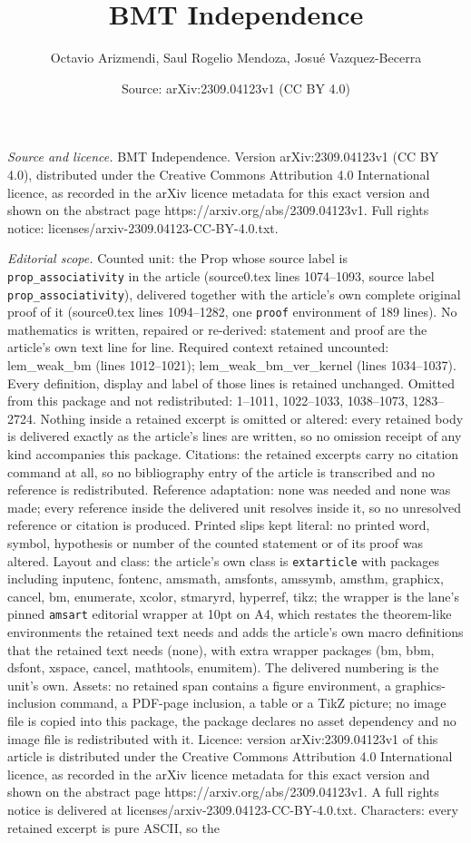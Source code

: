 \documentclass[10pt,a4paper]{amsart}
\title[BMT Independence]{BMT Independence}
\author{Octavio Arizmendi, Saul Rogelio Mendoza, Josu\'e Vazquez-Becerra}
\date{Source: arXiv:2309.04123v1 (CC BY 4.0)}
\begin{document}
\maketitle

\noindent\emph{Source and licence.} BMT Independence. Version arXiv:2309.04123v1 (CC BY 4.0), distributed under the Creative Commons Attribution 4.0 International licence, as recorded in the arXiv licence metadata for this exact version and shown on the abstract page https://arxiv.org/abs/2309.04123v1. Full rights notice: licenses/arxiv-2309.04123-CC-BY-4.0.txt.\par\smallskip

\noindent\textit{Editorial scope.} Counted unit: the Prop whose source label is \texttt{prop\_associativity} in the article (source0.tex lines 1074--1093, source label \texttt{prop\_associativity}), delivered together with the article's own complete original proof of it (source0.tex lines 1094--1282, one \texttt{proof} environment of 189 lines). No mathematics is written, repaired or re-derived: statement and proof are the article's own text line for line. Required context retained uncounted: lem\_weak\_bm (lines 1012--1021); lem\_weak\_bm\_ver\_kernel (lines 1034--1037). Every definition, display and label of those lines is retained unchanged. Omitted from this package and not redistributed: 1--1011, 1022--1033, 1038--1073, 1283--2724. Nothing inside a retained excerpt is omitted or altered: every retained body is delivered exactly as the article's lines are written, so no omission receipt of any kind accompanies this package. Citations: the retained excerpts carry no citation command at all, so no bibliography entry of the article is transcribed and no reference is redistributed. Reference adaptation: none was needed and none was made; every reference inside the delivered unit resolves inside it, so no unresolved reference or citation is produced. Printed slips kept literal: no printed word, symbol, hypothesis or number of the counted statement or of its proof was altered. Layout and class: the article's own class is \texttt{extarticle} with packages including inputenc, fontenc, amsmath, amsfonts, amssymb, amsthm, graphicx, cancel, bm, enumerate, xcolor, stmaryrd, hyperref, tikz; the wrapper is the lane's pinned \texttt{amsart} editorial wrapper at 10pt on A4, which restates the theorem-like environments the retained text needs and adds the article's own macro definitions that the retained text needs (none), with extra wrapper packages (bm, bbm, dsfont, xspace, cancel, mathtools, enumitem). The delivered numbering is the unit's own. Assets: no retained span contains a figure environment, a graphics-inclusion command, a PDF-page inclusion, a table or a TikZ picture; no image file is copied into this package, the package declares no asset dependency and no image file is redistributed with it. Licence: version arXiv:2309.04123v1 of this article is distributed under the Creative Commons Attribution 4.0 International licence, as recorded in the arXiv licence metadata for this exact version and shown on the abstract page https://arxiv.org/abs/2309.04123v1. A full rights notice is delivered at licenses/arxiv-2309.04123-CC-BY-4.0.txt. Characters: every retained excerpt is pure ASCII, so the 
\end{document}
